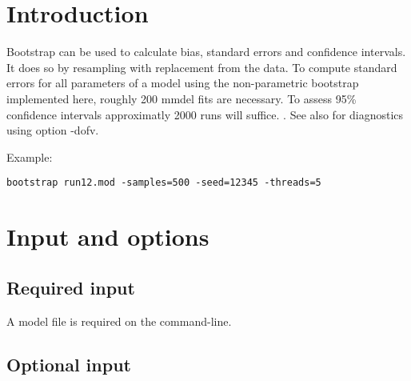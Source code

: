 



\maketitle
\newcommand{\guidetoolname}{bootstrap}


\section{Introduction}

Bootstrap can be used to calculate bias, standard errors and confidence intervals. 
It does so by resampling with replacement from the data. To compute standard errors for 
all parameters of a model using the non-parametric bootstrap implemented here, roughly 200 
mmdel fits are necessary. To assess 95\% confidence intervals approximatly 2000 runs will suffice.
\cite{Efron}. See also \cite{Niebecker} for diagnostics using option -dofv.

Example:
\begin{verbatim}
bootstrap run12.mod -samples=500 -seed=12345 -threads=5
\end{verbatim}

\section{Input and options}

\subsection{Required input}
A model file is required on the command-line.

\subsection{Optional input}
	
